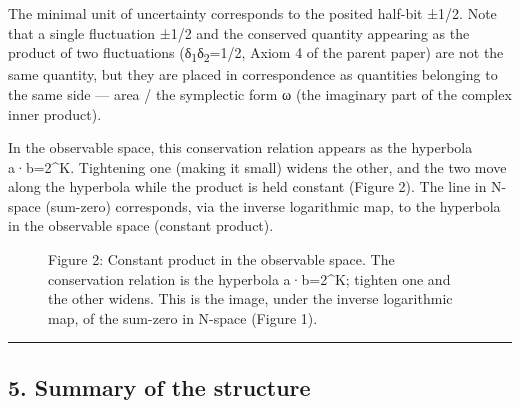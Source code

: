 \documentclass[11pt]{ltjsarticle}
\providecommand{\pandocbounded}[1]{#1}
\begin{document}
The minimal unit of uncertainty corresponds to the posited half-bit
±1/2. Note that a single fluctuation ±1/2 and the conserved quantity
appearing as the product of two fluctuations (δ\textsubscript{1}δ\textsubscript{2}=1/2, Axiom 4 of the
parent paper) are not the same quantity, but they are placed in
correspondence as quantities belonging to the same side --- area / the
symplectic form ω (the imaginary part of the complex inner product).

In the observable space, this conservation relation appears as the
hyperbola a·b=2\^{}K. Tightening one (making it small) widens the other,
and the two move along the hyperbola while the product is held constant
(Figure 2). The line in N-space (sum-zero) corresponds, via the inverse
logarithmic map, to the hyperbola in the observable space (constant
product).

\begin{figure}
\centering
\pandocbounded{}
\caption{Figure 2: Constant product in the observable space. The
conservation relation is the hyperbola a·b=2\^{}K; tighten one and the
other widens. This is the image, under the inverse logarithmic map, of
the sum-zero in N-space (Figure 1).}
\end{figure}

\begin{center}\rule{0.5\linewidth}{0.5pt}\end{center}

\subsection{5. Summary of the structure}\label{summary-of-the-structure}
\end{document}
